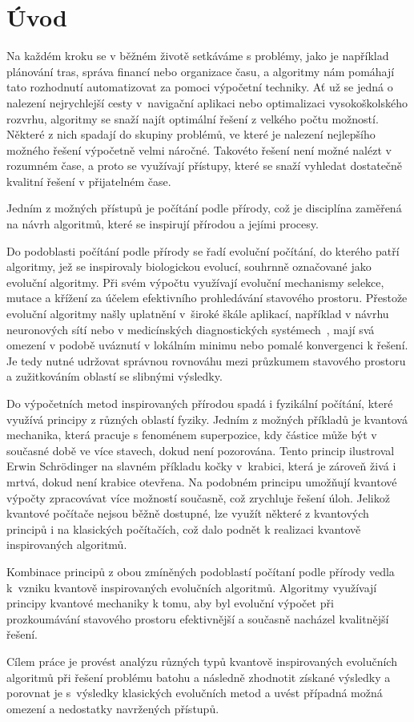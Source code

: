 \chapter{Úvod}
Na každém kroku se v běžném životě setkáváme s problémy, jako je například plánování tras, správa financí nebo organizace času, a algoritmy nám pomáhají tato rozhodnutí automatizovat za pomoci výpočetní techniky. 
Ať už se jedná o nalezení nejrychlejší cesty v~navigační aplikaci nebo optimalizaci vysokoškolského rozvrhu, algoritmy se snaží najít optimální řešení z velkého počtu možností. 
Některé z nich spadají do skupiny problémů, ve které je nalezení nejlepšího možného řešení výpočetně velmi náročné. 
Takovéto řešení není možné nalézt v rozumném čase, a proto se využívají přístupy, které se snaží vyhledat dostatečně kvalitní řešení v přijatelném čase. 

Jedním z možných přístupů je počítání podle přírody, což je disciplína zaměřená na návrh algoritmů, které se inspirují přírodou a jejími procesy. 

Do podoblasti počítání podle přírody se řadí evoluční počítání, do kterého patří algoritmy, jež se inspirovaly biologickou evolucí, souhrnně označované jako evoluční algoritmy. 
Při svém výpočtu využívají evoluční mechanismy selekce, mutace a křížení za účelem efektivního prohledávání stavového prostoru. 
Přestože evoluční algoritmy našly uplatnění v~široké škále aplikací, například v návrhu neuronových sítí nebo v medicínských diagnostických systémech~\cite{ea-applications}, mají svá omezení v podobě uváznutí v lokálním minimu nebo pomalé konvergenci k řešení. 
Je tedy nutné udržovat správnou rovnováhu mezi průzkumem stavového prostoru a zužitkováním oblastí se slibnými výsledky.

Do výpočetních metod inspirovaných přírodou spadá i fyzikální počítání, které využívá principy z různých oblastí fyziky. 
Jedním z možných příkladů je kvantová mechanika, která pracuje s fenoménem superpozice, kdy částice může být v současné době ve více stavech, dokud není pozorována. 
Tento princip ilustroval Erwin Schrödinger na slavném příkladu kočky v~krabici, která je zároveň živá i mrtvá, dokud není krabice otevřena. 
Na podobném principu umožňují kvantové výpočty zpracovávat více možností současně, což zrychluje řešení úloh.
Jelikož kvantové počítače nejsou běžně dostupné, lze využít některé z kvantových principů i na klasických počítačích, což dalo podnět k realizaci kvantově inspirovaných algoritmů. 

Kombinace principů z obou zmíněných podoblastí počítaní podle přírody vedla k~vzniku kvantově inspirovaných evolučních algoritmů. 
Algoritmy využívají principy kvantové mechaniky k tomu, aby byl evoluční výpočet při prozkoumávání stavového prostoru efektivnější a současně nacházel kvalitnější řešení. 

Cílem práce je provést analýzu různých typů kvantově inspirovaných evolučních algoritmů při řešení problému batohu a následně zhodnotit získané výsledky a porovnat je s~výsledky klasických evolučních metod a uvést případná možná omezení a nedostatky navržených přístupů.
